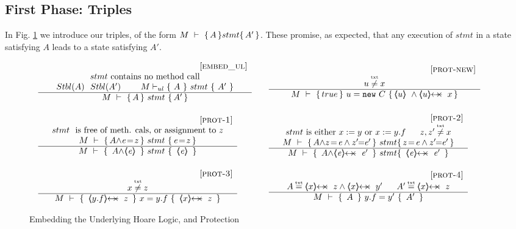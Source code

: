 \subsection{First Phase: Triples}
\label{s:hoare:first}

In  Fig. \ref{f:underly}  we introduce our triples, of the form ${   M\ \vdash\ \{\,A\, \} stmt \{\,A'\, \}}$. 
These promise, as expected, that any execution of $stmt$ in a state   satisfying $A$ leads to a state satisfying $A'$.

{\small{
\begin{figure}[tht]
$
\begin{array}{c}
\begin{array}{lcl}
\inferruleSD{\hspace{0.5cm} [\sc{embed\_ul}]}
	{stmt  \ \mbox{contains no method call}   
        \\
        \Stable{A}  \ \  \Stable{A'}  \ \ \ \ \  \ \ { M \vdash_{ul} \{ \ A\ \} {\ stmt\ }\{\ A'\ \}}
	 	 }
	{\hproves{M}  {A} {\ stmt\ }{A'} } 
& &
\inferruleSD{\hspace{0.5cm} [\sc{prot-new}]}
	{
	\sdN{u \txtneq   x	 }
	}
	{	 
 	\hproves{M} 
 						{ \sdN{true} }  
 					{\  u = \prg{new}\ C \ }
 						  {  \inside{u}\  \wedge  \protectedFrom{u}{x}} 
 	} 
\\ \\
	{\inferruleSD{\hspace{0.5cm} [\sc{prot-1}]}
	{   stmt \ \mbox{ is free of  meth. cals, or assignment to $z$}
	\\
	{\hproves{M}  {{A \wedge} \re\!=\!z} {\ stmt\ }{ \re\!=\!z} }
	}
	{\hproves{M} 
						{\  {A \wedge} \inside{\re}  \ }
						{\  stmt \ }
						{\  \inside{\re}\ }
	}
}
& &
      {\inferruleSD{\hspace{0.5cm} [\sc{prot-2}]}
	{ stmt \mbox{ is either $x:=y$ or $x:=y.f$}\ \ \ \ \    z,z' \txtneq x 
		\\
	{\hproves{M} 
						{  {A \wedge} z\!=\!\re \wedge z'\!\!=\!\! \re' }
						{\ stmt }
						{   z\!=\! \re \wedge z'\!\!=\!\! \re' }
	}
	}
	{
	\hproves{M} 
						{\ {A \wedge} \protectedFrom{\re}{\re'}\ }
						{\ stmt }
						{\ \protectedFrom{\re}{\re'}\ }
	}
}
\\ \\
      {\inferruleSD{\hspace{0.5cm} [\sc{prot-3}]}
	{\sdN{x \txtneq   z	 } }
	{\hproves{M} 
						{\ \protectedFrom{y.f}{z}\ }
						{\ x =y.f\ }
						{\ \protectedFrom{x}{z}\ }
	}
}
& &
        {\inferruleSD{\hspace{0.5cm} [\sc{prot-4}]}
	{ \ A\txteq\protectedFrom{x}{z}  \wedge   \protectedFrom{x}{y'} \ \ \ \  \ A'\txteq\protectedFrom{x}{z}\ }
	{\hproves{M} 
						{  \ A \  }
						{\ y.f=y'\ }
						{  \ A'\   }
	}
}
\end{array}
\end{array}
 $
\caption{Embedding the Underlying Hoare Logic, and Protection}
\label{f:protection}
\label{f:underly}
\end{figure}
}}


